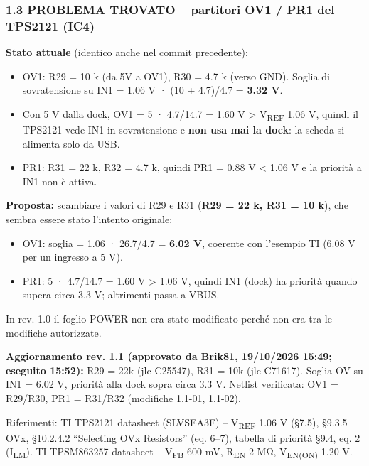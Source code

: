 \subsubsection[1.3 PROBLEMA TROVATO – partitori OV1 /\allowbreak{} PR1 del TPS2121 (IC4)]{1.3 PROBLEMA TROVATO – partitori OV1 /\allowbreak{} PR1 del TPS2121 (IC4) }

\begin{notebox}
\textbf{Stato attuale} (identico anche nel commit precedente):
\begin{itemize}
\item OV1: R29 = 10 k (da 5V a OV1), R30 = 4.7 k (verso GND). Soglia di sovratensione su IN1 = 1.06 V · (10 + 4.7)/\allowbreak{}4.7 = \textbf{3.32 V}.
\item Con 5 V dalla dock, OV1 = 5 · 4.7/\allowbreak{}14.7 = 1.60 V > V\textsubscript{REF} 1.06 V, quindi il TPS2121 vede IN1 in sovratensione e \textbf{non usa mai la dock}: la scheda si alimenta solo da USB.
\item PR1: R31 = 22 k, R32 = 4.7 k, quindi PR1 = 0.88 V < 1.06 V e la priorità a IN1 non è attiva.
\end{itemize}
 \textbf{Proposta:} scambiare i valori di R29 e R31 (\textbf{R29 = 22 k, R31 = 10 k}), che sembra essere stato l'intento originale:
\begin{itemize}
\item OV1: soglia = 1.06 · 26.7/\allowbreak{}4.7 = \textbf{6.02 V}, coerente con l'esempio TI (6.08 V per un ingresso a 5 V).
\item PR1: 5 · 4.7/\allowbreak{}14.7 = 1.60 V > 1.06 V, quindi IN1 (dock) ha priorità quando supera circa 3.3 V; altrimenti passa a VBUS.
\end{itemize}
 In rev. 1.0 il foglio POWER non era stato modificato perché non era tra le modifiche autorizzate.
\end{notebox}

\begin{okbox}
\textbf{Aggiornamento rev. 1.1 (approvato da Brik81, 19/\allowbreak{}10/\allowbreak{}2026 15:49; eseguito 15:52):} R29 = 22k (jlc C25547), R31 = 10k (jlc C71617). Soglia OV su IN1 = 6.02 V, priorità alla dock sopra circa 3.3 V. Netlist verificata: OV1 = R29/\allowbreak{}R30, PR1 = R31/\allowbreak{}R32 (modifiche 1.1-01, 1.1-02).
\end{okbox}

{\small Riferimenti: TI TPS2121 datasheet (SLVSEA3F) – V\textsubscript{REF} 1.06 V (§7.5), §9.3.5 OVx, §10.2.4.2 \textquotedblleft{}Selecting OVx Resistors\textquotedblright{} (eq. 6–7), tabella di priorità §9.4, eq. 2 (I\textsubscript{LM}). TI TPSM863257 datasheet – V\textsubscript{FB} 600 mV, R\textsubscript{EN} 2 MΩ, V\textsubscript{EN(ON)} 1.20 V.}

